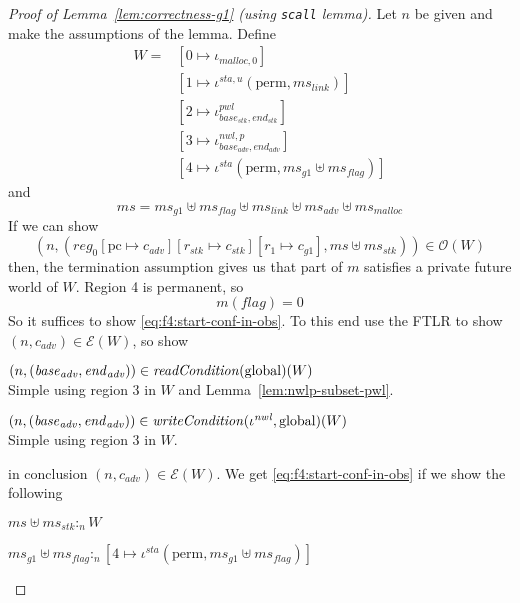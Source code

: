 \documentclass[a4paper]{article}
\newcommand{\update}[2]{[#1 \mapsto #2]}
\newcommand{\var}[1]{\mathit{#1}}
\newcommand{\hs}{\var{ms}}
\newcommand{\ms}{\hs}
\newcommand{\pcreg}{\mathrm{pc}}
\newcommand{\start}{\var{base}}
\newcommand{\addrend}{\var{end}}
\newcommand{\reg}{\var{reg}}
\newcommand{\heap}{\var{mem}}
\newcommand{\adv}{\var{adv}}
\newcommand{\link}{\var{link}}
\newcommand{\stk}{\var{stk}}
\newcommand{\flag}{\var{flag}}
\newcommand{\nwl}{\var{nwl}}
\newcommand{\pwl}{\var{pwl}}
\newcommand{\sta}{\var{sta}}
\newcommand{\plainfun}[2]{
  \ifthenelse{\equal{#2}{}}
  {\mathit{#1}}
  {\mathit{#1}(#2)}
}
\newcommand{\readCond}[1]{\plainfun{readCondition}{#1}}
\newcommand{\writeCond}[1]{\plainfun{writeCondition}{#1}}
\newcommand{\heapSat}[3][\heap]{#1 :_{#2} #3}
\newcommand{\memSat}[3][n]{\heapSat[#2]{#1}{#3}}
\newcommand{\codelabel}[1]{\mathit{#1}}
\newcommand{\malloc}{\codelabel{malloc}}
\newcommand{\asmType}{\plaindom{AsmType}}
\newcommand{\plaindom}[1]{\mathrm{#1}}
\newcommand{\intr}[2]{\mathcal{#1}}
\newcommand{\exprintr}[1]{\intr{E}{#1}}
\newcommand{\stder}{\exprintr{\asmType}}
\newcommand{\observations}{\mathcal{O}}
\newcommand{\npair}[2][n]{\left(#1,#2 \right)}
\newcommand{\plainperm}[1]{\mathrm{#1}}
\newcommand{\glob}{\plainperm{global}}
\newcommand{\plainview}[1]{\mathrm{#1}}
\newcommand{\perma}{\plainview{perm}}
\begin{document}
%
\begin{proof}[Proof of Lemma~\ref{lem:correctness-g1} (using \texttt{scall} lemma)]
  Let $n$ be given and make the assumptions of the lemma. Define
  \begin{align*}
    W = & [0 \mapsto \iota_{\malloc,0}]\\
        & [1 \mapsto \iota^{\sta,u} (\perma,\ms_\link)]\\
        & [2 \mapsto \iota^\pwl_{\start_\stk, \addrend_\stk}]\\
        & [3 \mapsto \iota^{\nwl,p}_{\start_\adv,\addrend_\adv}]\\
        & [4 \mapsto \iota^\sta (\perma,\ms_{g1} \uplus \ms_\flag)]
  \end{align*}
  and
  \[
    \ms = \ms_{g1} \uplus 
          \ms_\flag \uplus                
          \ms_\link \uplus 
          \ms_\adv \uplus 
          \ms_\malloc 
  \]
  If we can show
  \begin{equation}
    \label{eq:f4:start-conf-in-obs}
        \npair{(\reg_0\update{\pcreg}{c_\adv}\update{r_\stk}{c_\stk}\update{r_1}{c_{g1}},\ms \uplus \ms_\stk)} \in \observations(W)
  \end{equation}
  then, the termination assumption gives us that part of $m$ satisfies a private future world of $W$. Region 4 is permanent, so
  \[
    m(\flag) = 0
  \]
  So it suffices to show \ref{eq:f4:start-conf-in-obs}. 
  To this end use the FTLR to show $\npair{c_\adv} \in \stder(W)$, so show
  \begin{enumproof}
    \item $\npair{(\start_\adv,\addrend_\adv)} \in \readCond{}(\glob)(W)$\\
      Simple using region $3$ in $W$ and Lemma~\ref{lem:nwlp-subset-pwl}.
    \item $\npair{(\start_\adv,\addrend_\adv)} \in \writeCond{}(\iota^\nwl,\glob)(W)$\\
      Simple using region $3$ in $W$.
  \end{enumproof}
  in conclusion $\npair{c_\adv} \in \stder(W)$. We get \ref{eq:f4:start-conf-in-obs} if we show the following
  \begin{enumproof}[resume]
    \item $\memSat{\ms \uplus \ms_\stk}{W}$\\
      \begin{enumproof}
        \item $\memSat{\ms_{g1} \uplus \ms_\flag}{[4 \mapsto \iota^\sta (\perma,\ms_{g1} \uplus \ms_\flag)]}$ \\

\end{enumproof}
\end{enumproof}
\end{proof}
\end{document}
